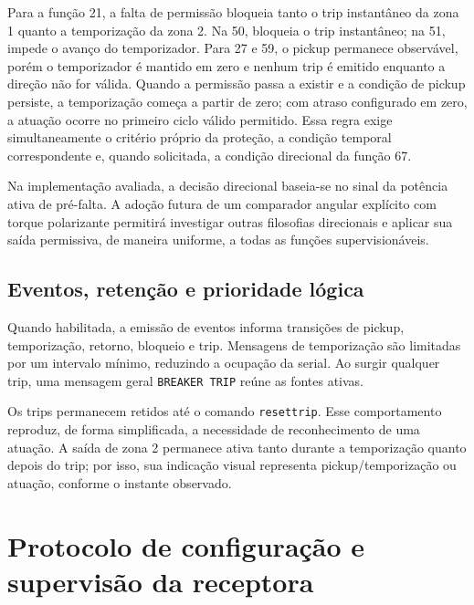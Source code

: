 Para a função 21, a falta de permissão bloqueia tanto o trip instantâneo da zona 1 quanto a temporização da zona 2. Na 50, bloqueia o trip instantâneo; na 51, impede o avanço do temporizador. Para 27 e 59, o pickup permanece observável, porém o temporizador é mantido em zero e nenhum trip é emitido enquanto a direção não for válida. Quando a permissão passa a existir e a condição de pickup persiste, a temporização começa a partir de zero; com atraso configurado em zero, a atuação ocorre no primeiro ciclo válido permitido. Essa regra exige simultaneamente o critério próprio da proteção, a condição temporal correspondente e, quando solicitada, a condição direcional da função 67.

Na implementação avaliada, a decisão direcional baseia-se no sinal da potência ativa de pré-falta. A adoção futura de um comparador angular explícito com torque polarizante permitirá investigar outras filosofias direcionais e aplicar sua saída permissiva, de maneira uniforme, a todas as funções supervisionáveis.

\subsection{Eventos, retenção e prioridade lógica}

Quando habilitada, a emissão de eventos informa transições de pickup, temporização, retorno, bloqueio e trip. Mensagens de temporização são limitadas por um intervalo mínimo, reduzindo a ocupação da serial. Ao surgir qualquer trip, uma mensagem geral \texttt{BREAKER TRIP} reúne as fontes ativas.

Os trips permanecem retidos até o comando \texttt{resettrip}. Esse comportamento reproduz, de forma simplificada, a necessidade de reconhecimento de uma atuação. A saída de zona 2 permanece ativa tanto durante a temporização quanto depois do trip; por isso, sua indicação visual representa pickup/temporização ou atuação, conforme o instante observado.

\section{Protocolo de configuração e supervisão da receptora}

